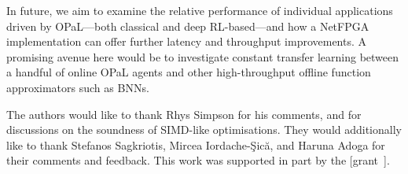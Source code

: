 \documentclass[sigconf,natbib=false]{acmart}
\newcommand{\approachshort}{OPaL}
\begin{document}
In future, we aim to examine the relative performance of individual applications driven by \approachshort---both classical and deep RL-based---and how a NetFPGA implementation can offer further latency and throughput improvements.
A promising avenue here would be to investigate constant transfer learning between a handful of online \approachshort{} agents and other high-throughput offline function approximators such as BNNs.

\begin{acks}
	The authors would like to thank Rhys Simpson for his comments, and for discussions on the soundness of SIMD-like optimisations.
	They would additionally like to thank Stefanos Sagkriotis, Mircea Iordache-\c{S}ic\u{a}, and Haruna Adoga for their comments and feedback.
	This work was supported in part by the  [grant~].
\end{acks}
	
%
%
\printbibliography
\end{document}
